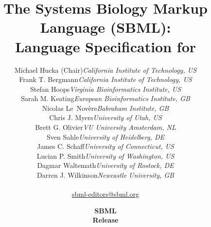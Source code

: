 
\title{{The Systems Biology Markup Language (SBML):}\\
Language Specification for \thisLV}

\author{\begin{tabular}{l>{\hspace*{15pt}}r}
Michael Hucka (Chair)	& \emph{California Institute of Technology, US}\\
Frank T. Bergmann  	& \emph{California Institute of Technology, US}\\
Stefan Hoops		& \emph{Virginia Bioinformatics Institute, US}\\
Sarah M. Keating	& \emph{European Bioinformatics Institute, GB}\\
Nicolas Le~Nov\`{e}re	& \emph{Babraham Institute, GB}\\
Chris J. Myers		& \emph{University of Utah, US}\\
Brett G. Olivier	& \emph{VU University Amsterdam, NL}\\
Sven Sahle		& \emph{University of Heidelberg, DE}\\
James C. Schaff		& \emph{University of Connecticut, US}\\
Lucian P. Smith		& \emph{University of Washington, US}\\
Dagmar Waltemath	& \emph{University of Rostock, DE}\\
Darren J. Wilkinson	& \emph{Newcastle University, GB}\\[8pt]
\end{tabular}\\
\href{mailto:sbml-editors@sbml.org}{\sffamily sbml-editors@sbml.org}}

\date{\vfill \textbf{SBML \thisLV} \\[10pt]
  \textbf{Release \sbmlrelease} \\[10pt]
  \sbmldate}



\maketitle

